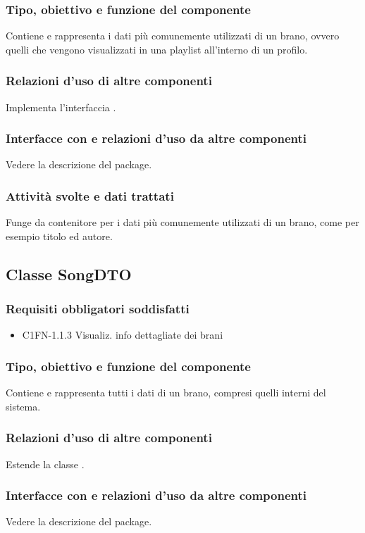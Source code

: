 \subsubsection*{Tipo, obiettivo e funzione del componente}
Contiene e rappresenta i dati pi\`u comunemente utilizzati di un brano, ovvero
quelli che vengono visualizzati in una playlist all'interno di un profilo.
\subsubsection*{Relazioni d'uso di altre componenti}
Implementa l'interfaccia .
\subsubsection*{Interfacce con e relazioni d'uso da altre componenti}
Vedere la descrizione del package.
\subsubsection*{Attivit\`a svolte e dati trattati}
Funge da contenitore per i dati pi\`u comunemente utilizzati di un brano, come
per esempio titolo ed autore.

\subsection{Classe SongDTO}
\subsubsection*{Requisiti obbligatori soddisfatti}
\begin{itemize}
	\item C1FN-1.1.3 Visualiz. info dettagliate dei brani
\end{itemize}
\subsubsection*{Tipo, obiettivo e funzione del componente}
Contiene e rappresenta tutti i dati di un brano, compresi quelli interni del
sistema. 
\subsubsection*{Relazioni d'uso di altre componenti}
Estende la classe .
\subsubsection*{Interfacce con e relazioni d'uso da altre componenti}
Vedere la descrizione del package.
